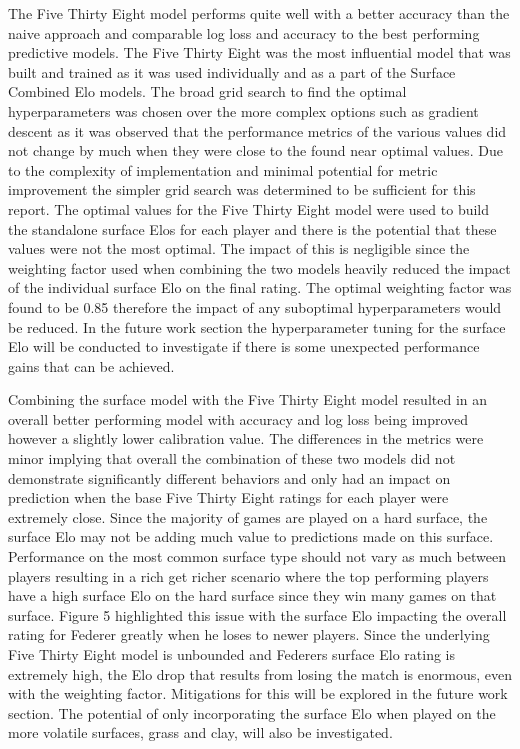 \documentclass[12pt,a4paper]{article}
\begin{document}
The Five Thirty Eight model performs quite well with a better accuracy than the naive approach and
comparable log loss and accuracy to the best performing predictive models. The Five Thirty Eight
was the most influential model that was built and trained as it was used individually and as a
part of the Surface Combined Elo models. The broad grid search to find the optimal hyperparameters
was chosen over the more complex options such as gradient descent as it was observed that the
performance metrics of the various values did not change by much when they were close to the found
near optimal values. Due to the complexity of implementation and minimal potential for metric
improvement the simpler grid search was determined to be sufficient for this report. The optimal
values for the Five Thirty Eight model were used to build the standalone surface Elos for each
player and there is the potential that these values were not the most optimal. The impact of this
is negligible since the weighting factor used when combining the two models heavily reduced the impact
of the individual surface Elo on the final rating. The optimal weighting factor was found to be 0.85
therefore the impact of any suboptimal hyperparameters would be reduced. In the future work
section the hyperparameter tuning for the surface Elo will be conducted to investigate if there is
some unexpected performance gains that can be achieved.

Combining the surface model with the Five Thirty Eight model resulted in an overall better performing
model with accuracy and log loss being improved however a slightly lower calibration value.
The differences in the metrics were minor implying that overall the combination of these two models
did not demonstrate significantly different behaviors and only had an impact on prediction when the
base Five Thirty Eight ratings for each player were extremely close. Since the majority of games
are played on a hard surface, the surface Elo may not be adding much value to predictions made on
this surface. Performance on the most common surface type should not vary as much between players
resulting in a rich get richer scenario where the top performing players have a high surface Elo
on the hard surface since they win many games on that surface. Figure 5 highlighted this issue with
the surface Elo impacting the overall rating for Federer greatly when he loses to newer players.
Since the underlying Five Thirty Eight model is unbounded and Federers surface Elo rating is
extremely high, the Elo drop that results from losing the match is enormous, even with the weighting
factor. Mitigations for this will be explored in the future work section. The
potential of only incorporating the surface Elo when played on the more volatile surfaces, grass
and clay, will also be investigated.
\end{document}
